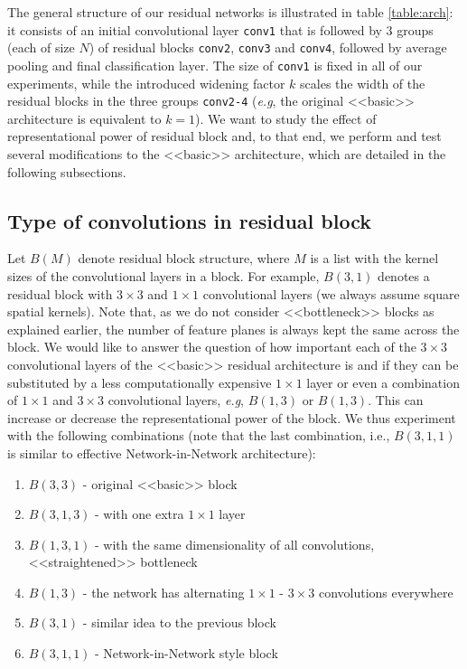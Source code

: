 \documentclass{bmvc2k}
\def\eg{\emph{e.g}\bmvaOneDot}
\begin{document}
The general structure of our residual networks is illustrated in  table \ref{table:arch}: it consists of an initial convolutional layer \texttt{conv1} that is followed by 3 groups (each of size $N$) of residual blocks \texttt{conv2}, \texttt{conv3} and \texttt{conv4},  followed by average pooling and final classification layer. The size of \texttt{conv1} is fixed in all of our experiments, while the introduced widening factor $k$ scales the width of the residual blocks in the three groups \texttt{conv2-4} (\eg, the original <<basic>> architecture is equivalent to $k = 1$).
We want to study the effect of representational power of residual block and, to that end, we perform and test several modifications to the <<basic>> architecture, which are detailed in the following subsections.

\subsection{Type of convolutions in residual block}
Let $B(M)$ denote residual block structure, where $M$ is a list with the kernel sizes of the convolutional layers in a block. For example, $B(3,1)$ denotes a residual block with $3\times3$ and $1\times1$ convolutional layers (we always assume square spatial kernels). Note that, as  we do not consider <<bottleneck>> blocks as explained earlier, the number of feature planes is always kept the same across the block. We would like to answer the question of how important each  of the $3\times3$ convolutional layers of the <<basic>> residual architecture is and if they can be substituted by  a less computationally expensive $1\times1$ layer or even a combination of $1\times1$ and $3\times3$ convolutional layers,
\eg, $B(1,3)$ or $B(1,3)$. This can increase or decrease the representational power of the block. We thus experiment with the following combinations (note that the last combination, i.e., $B(3,1,1)$ is similar to effective Network-in-Network \cite{nin} architecture):

\vspace{-0.1cm}
\newcommand{\conv}[1]{C#1}
\begin{enumerate}
    \setlength\itemsep{-0.2em}
  \item{$B(3,3)$ - original <<basic>> block}
  \item{$B(3,1,3)$ - with one extra $1\times1$ layer}
  \item{$B(1,3,1)$ - with the same dimensionality of all convolutions, <<straightened>> bottleneck}
  \item{$B(1,3)$ - the network has alternating $1\times1$ - $3\times3$ convolutions everywhere}
  \item{$B(3,1)$ - similar idea to the previous block}
  \item{$B(3,1,1)$ - Network-in-Network style block}
\end{enumerate}
\end{document}
